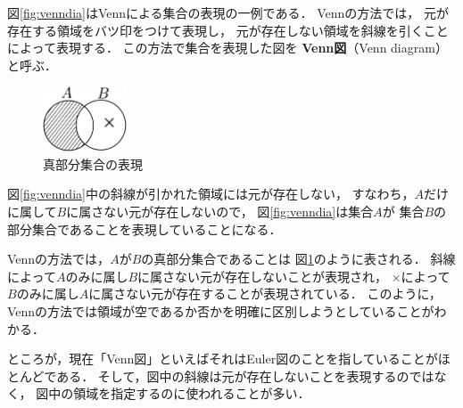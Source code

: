    図\ref{fig:venndia}はVennによる集合の表現の一例である．
   Vennの方法では，
   元が存在する領域をバツ印をつけて表現し，
   元が存在しない領域を斜線を引くことによって表現する．
   この方法で集合を表現した図を
   \textbf{Venn図}（Venn diagram）
   と呼ぶ．
   \begin{figure}
     \centering
     \includegraphics[width=2.5cm]{inputyou/set/picture/setvennproper.pdf}
     \caption{真部分集合の表現}
     \label{fig:propersubset}
   \end{figure}
   図\ref{fig:venndia}中の斜線が引かれた領域には元が存在しない，
   すなわち，$A$だけに属して$B$に属さない元が存在しないので，
   図\ref{fig:venndia}は集合$A$が
   集合$B$の部分集合であることを表現していることになる．

   Vennの方法では，$A$が$B$の真部分集合であることは
   図\ref{fig:propersubset}のように表される．
   斜線によって$A$のみに属し$B$に属さない元が存在しないことが表現され，
   $\times$によって$B$のみに属し$A$に属さない元が存在することが表現されている．
   このように，Vennの方法では領域が空であるか否かを明確に区別しようとしていることがわかる．

   ところが，現在「Venn図」といえばそれはEuler図のことを指していることがほとんどである．
   そして，図中の斜線は元が存在しないことを表現するのではなく，
   図中の領域を指定するのに使われることが多い．
   
